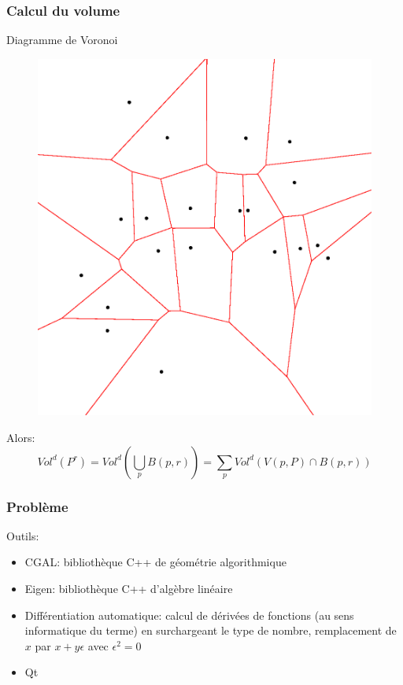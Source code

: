 \documentclass{beamer}
\begin{document}
\begin{frame}
    \frametitle{Calcul du volume}

    Diagramme de Voronoi
    \begin{figure}
        \centering
        \includegraphics[scale=0.28]{img/voronoi-diagram-2d}
    \end{figure}

    Alors:
    $$ Vol^d(P^r) = Vol^d \left( \bigcup_p B(p, r) \right) = \sum_p Vol^d(V(p, P) \cap B(p, r)) $$
\end{frame}

\begin{frame}
    \frametitle{Problème}

    Outils:
    \begin{itemize}
        \item CGAL: bibliothèque C++ de géométrie algorithmique
        \item Eigen: bibliothèque C++ d'algèbre linéaire
        \item Différentiation automatique: calcul de dérivées de fonctions (au
            sens informatique du terme) en surchargeant le type de nombre,
            remplacement de $ x $ par $ x + y\epsilon $ avec $ \epsilon^2 = 0 $
        \item Qt
    \end{itemize}
\end{frame}
\end{document}
